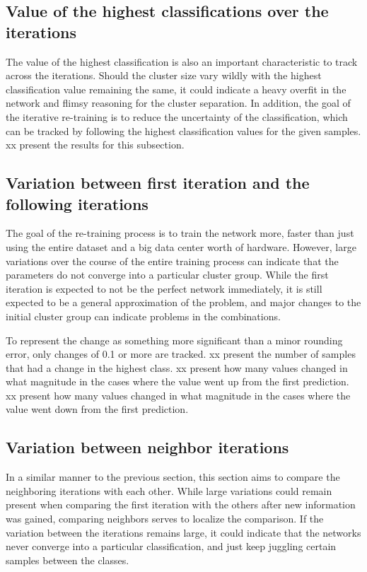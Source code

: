\subsection{Value of the highest classifications over the iterations}
The value of the highest classification is also an important characteristic to track across the iterations.
Should the cluster size vary wildly with the highest classification value remaining the same, it could indicate a heavy overfit in the network and flimsy reasoning for the cluster separation.
In addition, the goal of the iterative re-training is to reduce the uncertainty of the classification, which can be tracked by following the highest classification values for the given samples.
xx present the results for this subsection.


\subsection{Variation between first iteration and the following iterations}
The goal of the re-training process is to train the network more, faster than just using the entire dataset and a big data center worth of hardware.
However, large variations over the course of the entire training process can indicate that the parameters do not converge into a particular cluster group.
While the first iteration is expected to not be the perfect network immediately, it is still expected to be a general approximation of the problem, and major changes to the initial cluster group can indicate problems in the combinations.

To represent the change as something more significant than a minor rounding error, only changes of 0.1 or more are tracked.
xx present the number of samples that had a change in the highest class.
xx present how many values changed in what magnitude in the cases where the value went up from the first prediction.
xx present how many values changed in what magnitude in the cases where the value went down from the first prediction.

\subsection{Variation between neighbor iterations}
In a similar manner to the previous section, this section aims to compare the neighboring iterations with each other.
While large variations could remain present when comparing the first iteration with the others after new information was gained, comparing neighbors serves to localize the comparison.
If the variation between the iterations remains large, it could indicate that the networks never converge into a particular classification, and just keep juggling certain samples between the classes.

